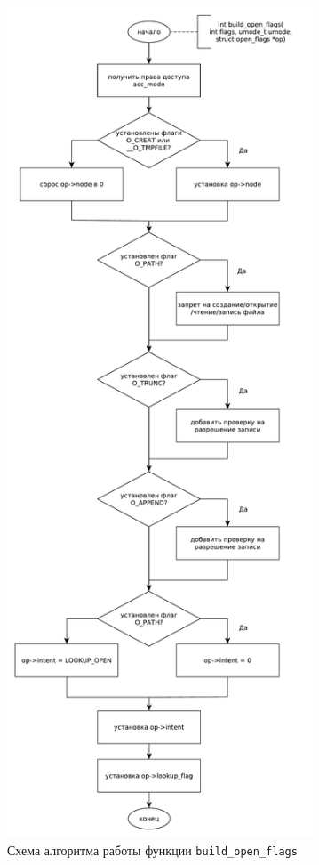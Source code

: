 \clearpage

\begin{figure}[h!btp]
	\centering
	\includegraphics[height=700pt]{inc/build_open_flags.pdf}
	\caption{Схема алгоритма работы функции \texttt{build\_open\_flags}}
\end{figure}

\clearpage

